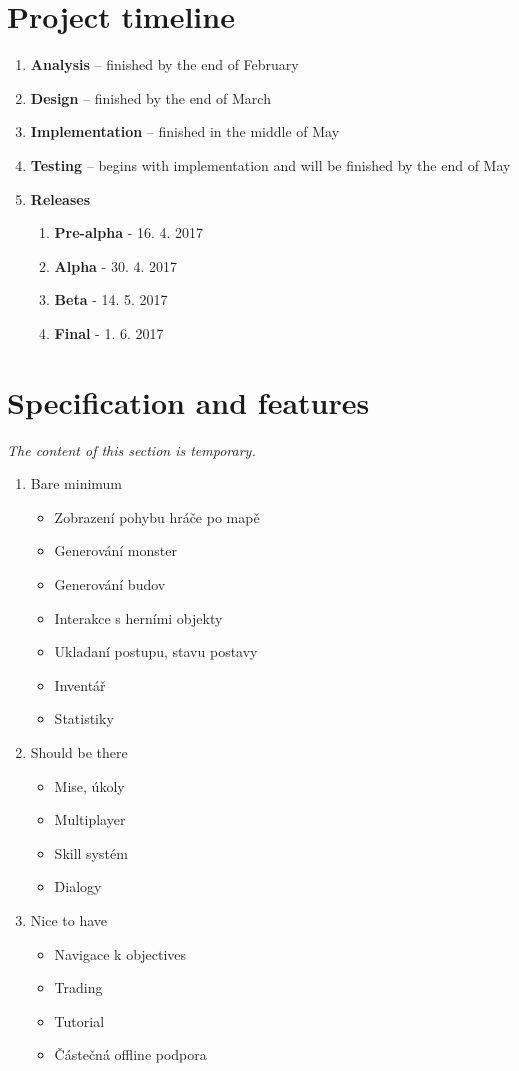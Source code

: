 \section{Project timeline}
\begin{enumerate}
	\item \textbf{Analysis} -- finished by the end of February
	\item \textbf{Design} -- finished by the end of March
	\item \textbf{Implementation} -- finished in the middle of May
	\item \textbf{Testing} -- begins with implementation and will be finished by the end of May  
	
	\item \textbf{Releases}
		\begin{enumerate}
			\item \textbf{Pre-alpha} - 16. 4. 2017
			\item \textbf{Alpha} - 30. 4. 2017
			\item \textbf{Beta} - 14. 5. 2017
			\item \textbf{Final} - 1. 6. 2017
		\end{enumerate} 	
\end{enumerate}


\section{Specification and features}
\textit{The content of this section is temporary.}
\begin{enumerate}
	\item Bare minimum
		\begin{itemize}
			\item Zobrazení pohybu hráče po mapě
			\item Generování monster
			\item Generování budov
			\item Interakce s herními objekty
			\item Ukladaní postupu, stavu postavy
			\item Inventář
			\item Statistiky	
		\end{itemize}
	
	\item Should be there
		\begin{itemize}
			\item Mise, úkoly
			\item Multiplayer
			\item Skill systém
			\item Dialogy
		\end{itemize}
	
	\item Nice to have
		\begin{itemize}
			\item Navigace k objectives
			\item Trading
			\item Tutorial
			\item Částečná offline podpora
		\end{itemize}
\end{enumerate}


